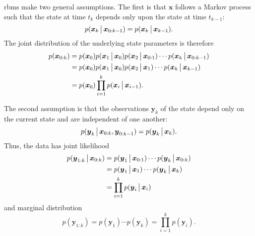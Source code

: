 \Glspl{rbm} make two general assumptions. The first is that $\boldsymbol{x}$ follows a Markov process such that the state at time $t_k$ depends only upon the state at time $t_{k-1}$:
\begin{equation}
\label{eq:rbe_markov}
p(\boldsymbol{x}_k \,\big|\,{} \boldsymbol{x}_{0:k-1}) =
p(\boldsymbol{x}_k \,\big|\,{} \boldsymbol{x}_{k-1}).
\end{equation}
The joint distribution of the underlying state parameters is therefore
\begin{equation}
\label{eq:rbe_joint_x}
\begin{split}
p(\boldsymbol x_{0:k})
&= p(\boldsymbol x_0)p(\boldsymbol x_1\,\big|\,{}\boldsymbol x_0)p(\boldsymbol x_2\,\big|\,{}\boldsymbol x_{0:1})\cdots
p(\boldsymbol x_{k}\,\big|\,{}\boldsymbol x_{0:k-1}) \\
&= p(\boldsymbol x_0)p(\boldsymbol x_1\,\big|\,{}\boldsymbol x_0)p(\boldsymbol x_2\,\big|\,{}\boldsymbol x_1)\cdots p(\boldsymbol x_k\,\big|\,{}\boldsymbol x_{k-1}) \\
&= p(\boldsymbol x_0)\prod_{i=1}^k p(\boldsymbol x_i\,\big|\,{}\boldsymbol x_{i-1}).
\end{split}
\end{equation}

The second assumption is that the observations $\boldsymbol{y}_k$ of the state depend only on the current state and are independent of one another:
\begin{equation}
\label{eq:rbe_obs}
p(\boldsymbol{y}_k \,\big|\,{} \boldsymbol{x}_{0:k}, \boldsymbol{y}_{0:k-1}) =
p(\boldsymbol{y}_k \,\big|\,{} \boldsymbol{x}_{k}).
\end{equation}
Thus, the data has joint likelihood
\begin{equation}
\label{eq:rbe_joint_lh}
\begin{split}
p(\boldsymbol{y}_{1:k}\,\big|\,{}\boldsymbol x_{0:k})
&= p(\boldsymbol{y}_1\,\big|\,{}\boldsymbol x_{0:1})\cdots p(\boldsymbol{y}_k\,\big|\,{}\boldsymbol x_{0:k}) \\
&= p(\boldsymbol{y}_1\,\big|\,{}\boldsymbol x_1)\cdots p(\boldsymbol{y}_k\,\big|\,{}\boldsymbol x_k) \\
&= \prod_{i=1}^k p(\boldsymbol{y}_i\,\big|\,{}\boldsymbol x_i)
\end{split}
\end{equation}
and marginal distribution
\begin{equation}
\label{eq:rbe_marginal_y}
p(\boldsymbol{y}_{1:k}) = p(\boldsymbol{y}_1)\cdots p(\boldsymbol{y}_k)
= \prod_{i=1}^k p(\boldsymbol{y}_i).
\end{equation}



